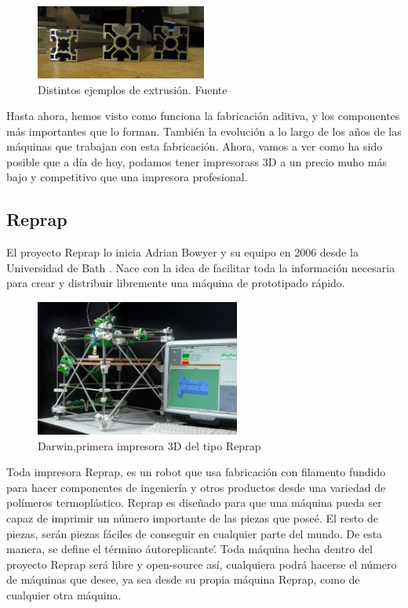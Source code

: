 \begin{itemize}
    \begin{figure}[H]
            \centering
            \includegraphics[width=0.5\textwidth]{images/Extruded_aluminium_section.jpg}
            \caption{Distintos ejemplos de extrusión. Fuente \cite{ejemplosextrusion}}
            \label{fig:estado_ejemplos}
    \end{figure}
\end{itemize}
Hasta ahora, hemos visto como funciona la fabricación aditiva, y los componentes más importantes que lo forman. También la evolución a lo largo de los años de las máquinas que trabajan con esta fabricación. Ahora, vamos a ver como ha sido posible que a día de hoy, podamos tener impresorass 3D a un precio muho más bajo y competitivo que una impresora profesional.\\
\subsection{Reprap}
El proyecto Reprap lo inicia Adrian Bowyer y su equipo en 2006 desde la Universidad de Bath \cite{jones2011reprap}. Nace con la idea de facilitar toda la información necesaria para crear y distribuir libremente una máquina de prototipado rápido. 

\begin{figure}[H]
        \centering
        \includegraphics[width=0.6\textwidth]{images/darwin.jpg}
        \caption{Darwin,primera impresora 3D del tipo Reprap}
        \label{fig:estado_darwin}
\end{figure}

Toda impresora Reprap, es un robot que usa fabricación con filamento fundido para hacer componentes de ingeniería y otros productos desde una variedad de polímeros termoplástico. Reprap es diseñado para  que una máquina pueda ser capaz de imprimir un número importante de las piezas que poseé. El resto de piezas, serán piezas fáciles de conseguir en cualquier parte del mundo. De esta manera, se define el término \'autoreplicante\'. Toda máquina hecha dentro del proyecto Reprap será libre y open-source así, cualquiera podrá hacerse el número de máquinas que desee, ya sea desde su propia máquina Reprap, como de cualquier otra máquina.\\

